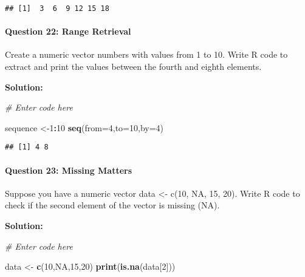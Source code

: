 \documentclass[
]{article}
\newenvironment{Shaded}{\begin{snugshade}}{\end{snugshade}}
\newcommand{\AttributeTok}[1]{\textcolor[rgb]{0.13,0.29,0.53}{#1}}
\newcommand{\CommentTok}[1]{\textcolor[rgb]{0.56,0.35,0.01}{\textit{#1}}}
\newcommand{\ConstantTok}[1]{\textcolor[rgb]{0.56,0.35,0.01}{#1}}
\newcommand{\DecValTok}[1]{\textcolor[rgb]{0.00,0.00,0.81}{#1}}
\newcommand{\FunctionTok}[1]{\textcolor[rgb]{0.13,0.29,0.53}{\textbf{#1}}}
\newcommand{\NormalTok}[1]{#1}
\newcommand{\OtherTok}[1]{\textcolor[rgb]{0.56,0.35,0.01}{#1}}
\newcommand{\SpecialCharTok}[1]{\textcolor[rgb]{0.81,0.36,0.00}{\textbf{#1}}}
\begin{document}
\begin{verbatim}
## [1]  3  6  9 12 15 18
\end{verbatim}

\hypertarget{question-22-range-retrieval}{%
\paragraph{Question 22: Range
Retrieval}\label{question-22-range-retrieval}}

Create a numeric vector numbers with values from 1 to 10. Write R code
to extract and print the values between the fourth and eighth elements.

\textbf{Solution:}

\begin{Shaded}
\begin{Highlighting}[]
\CommentTok{\# Enter code here}

\NormalTok{sequence }\OtherTok{\textless{}{-}}\DecValTok{1}\SpecialCharTok{:}\DecValTok{10}
\FunctionTok{seq}\NormalTok{(}\AttributeTok{from=}\DecValTok{4}\NormalTok{,}\AttributeTok{to=}\DecValTok{10}\NormalTok{,}\AttributeTok{by=}\DecValTok{4}\NormalTok{)}
\end{Highlighting}
\end{Shaded}

\begin{verbatim}
## [1] 4 8
\end{verbatim}

\hypertarget{question-23-missing-matters}{%
\paragraph{Question 23: Missing
Matters}\label{question-23-missing-matters}}

Suppose you have a numeric vector data \textless- c(10, NA, 15, 20).
Write R code to check if the second element of the vector is missing
(NA).

\textbf{Solution:}

\begin{Shaded}
\begin{Highlighting}[]
\CommentTok{\# Enter code here}

\NormalTok{data }\OtherTok{\textless{}{-}} \FunctionTok{c}\NormalTok{(}\DecValTok{10}\NormalTok{,}\ConstantTok{NA}\NormalTok{,}\DecValTok{15}\NormalTok{,}\DecValTok{20}\NormalTok{)}
\FunctionTok{print}\NormalTok{(}\FunctionTok{is.na}\NormalTok{(data[}\DecValTok{2}\NormalTok{]))}
\end{Highlighting}
\end{Shaded}
\end{document}
